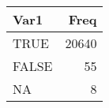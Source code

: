 \begin{table}[H]
\centering
\begin{tabular}[t]{lr}
\toprule
Var1 & Freq\\
\midrule
TRUE & 20640\\
FALSE & 55\\
NA & 8\\
\bottomrule
\end{tabular}
\end{table}